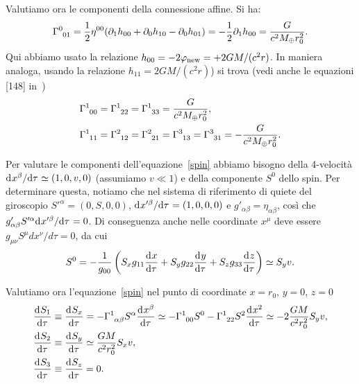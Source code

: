 Valutiamo ora le componenti della connessione affine.  Si ha:
\begin{equation}
  \tensor{\Gamma}{^{0}_{01}} =
  \frac{1}{2} \eta^{00} (\partial_1 h_{00} + \partial_0 h_{10}- \partial_0
  h_{01} ) =
  -  \frac{1}{2} \partial_1 h_{00} =   \frac {G} {c^2 M_{\oplus} r_0^2}.
\end{equation}
Qui abbiamo usato la relazione $h_{00}=-2 \phi_{\textup{new}} = + 2GM/(c^2 r)$.
In maniera analoga, usando la relazione $h_{11}=2GM/(c^2 r)$) si trova (vedi
anche le equazioni [148] in~\textcite[353]{ohanian:gravitazione})
\begin{subequations}
  \begin{align}
    \tensor{\Gamma}{^{1}_{00}} &= \tensor{\Gamma}{^{1}_{22}} =
    \tensor{\Gamma}{^{1}_{33}} = \frac{G}{c^2 M_{\oplus} r_0^2}, \\
    \tensor{\Gamma}{^{1}_{11}} &= \tensor{\Gamma}{^{2}_{12}} =
    \tensor{\Gamma}{^{2}_{21}} = \tensor{\Gamma}{^{3}_{13}} =
    \tensor{\Gamma}{^{3}_{31}} = -\frac{G}{c^2 M_{\oplus} r_0^2}.
  \end{align}
\end{subequations}

Per valutare le componenti dell'equazione~\eqref{spin} abbiamo bisogno della
4-velocità $\ltoder{x^{\beta}}{\tau} \simeq (1,0,v,0)$ (assumiamo $v\ll 1$) e
della componente $S^0$ dello spin.  Per determinare questa, notiamo che nel
sistema di riferimento di quiete del giroscopio $S'^{\alpha}=(0,S,0,0)$,
$\ltoder{x'^{\beta}}{\tau} = (1,0,0,0)$ e $g'_{\alpha \beta} = \eta_{\alpha
  \beta}$, così che $g'_{\alpha \beta} S'^{\alpha} \ltoder{x'^{\beta}}{\tau}
=0$.  Di conseguenza anche nelle coordinate $x^{\mu}$ deve essere $g_{\mu \nu}
S^{\mu} dx^{\nu}/d\tau =0$, da cui
\begin{equation}
  S^0 = - \frac{1}{g_{00}} \left( S_x g_{11} \toder{x}{\tau} + S_y g_{22}
    \toder{y}{\tau} + S_z g_{33} \toder{z}{\tau}\right) \simeq S_y v.
\end{equation}

Valutiamo ora l'equazione~\eqref{spin} nel punto di coordinate $x=r_0$, $y=0$,
$z=0$
\begin{subequations}
  \begin{align}
    \toder{S_1}{\tau} &\equiv \toder{S_x}{\tau} =
                        -\tensor{\Gamma}{^1_{\alpha \beta}} S^{\alpha}
                        \toder{x^{\beta}}{\tau} \simeq
                        -\tensor{\Gamma}{^1_{00}} S^0  -
                        \tensor{\Gamma}{^1_{22}} S^2 \toder{x^2}{\tau} \simeq
                        -2 \frac{GM}{c^2 r_0^2} S_y v, \\
    \toder{S_2}{\tau} &\equiv \toder{S_y}{\tau} \simeq \frac{GM}{c^2 r_0^2} S_x
                        v, \\
    \toder{S_3}{\tau} &\equiv \toder{S_z}{\tau} = 0.
  \end{align}
\end{subequations}

